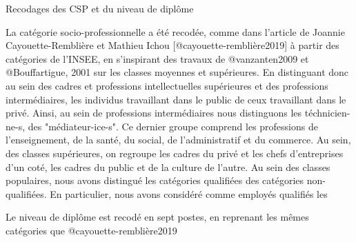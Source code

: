 \documentclass[
  12pt,
]{book}
\begin{document}
\begin{encadre}{Recodages des CSP et du niveau de diplôme}

La catégorie socio-professionnelle a été recodée, comme dans l'article de Joannie Cayouette-Remblière et Mathieu Ichou [@cayouette-remblière2019] à partir des catégories de l'INSEE, en s'inspirant des travaux de @vanzanten2009 et @Bouffartigue, 2001 sur les classes moyennes et supérieures. En distinguant donc au sein des cadres et professions intellectuelles supérieures et des professions intermédiaires, les individus travaillant dans le public de ceux travaillant dans le privé. Ainsi, au sein de professions intermédiaires nous distinguons les téchnicien-ne-s, des "médiateur-ice-s". Ce dernier groupe comprend les professions de l'enseignement, de la santé, du social, de l'administratif et du commerce.  Au sein, des classes supérieures, on regroupe les cadres du privé et les chefs d'entreprises d'un coté, les cadres du public et de la culture de l'autre. 
Au sein des classes populaires, nous avons distingué les catégories qualifiées des catégories non-qualifiées. En particulier, nous avons considéré comme employés qualifiés les 

Le niveau de diplôme est recodé en sept postes, en reprenant les mêmes catégories que @cayouette-remblière2019

\end{encadre}
\end{document}
